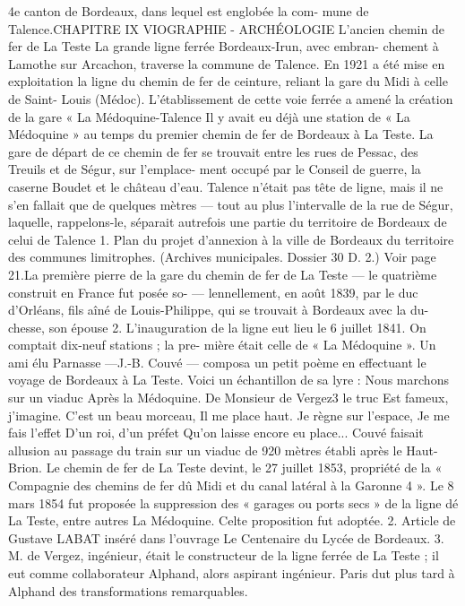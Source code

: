 \documentclass[a4paper,11pt]{book}
\begin{document}
4e canton de Bordeaux, dans lequel est englobée la com-
mune de Talence.CHAPITRE IX
VIOGRAPHIE - ARCHÉOLOGIE
L'ancien chemin de fer de La Teste
La grande ligne ferrée Bordeaux-Irun, avec embran-
chement à Lamothe sur Arcachon, traverse la commune
de Talence.
En 1921 a été mise en exploitation la ligne du chemin
de fer de ceinture, reliant la gare du Midi à celle de Saint-
Louis (Médoc). L'établissement de cette voie ferrée a amené
la création de la gare « La Médoquine-Talence
Il y avait eu déjà une station de « La Médoquine » au
temps du premier chemin de fer de Bordeaux à La Teste.
La gare de départ de ce chemin de fer se trouvait entre
les rues de Pessac, des Treuils et de Ségur, sur l'emplace-
ment occupé par le Conseil de guerre, la caserne Boudet
et le château d'eau.
Talence n'était pas tête de ligne, mais il ne s'en fallait
que de quelques mètres — tout au plus l'intervalle de la
rue de Ségur, laquelle, rappelons-le, séparait autrefois
une partie du territoire de Bordeaux de celui de Talence
1. Plan du projet d'annexion à la ville de Bordeaux du territoire des
communes limitrophes. (Archives municipales. Dossier 30 D. 2.) Voir
page 21.La première pierre de la gare du chemin de fer de La
Teste — le quatrième construit en France
fut
posée so-
—
lennellement, en août 1839, par le duc d'Orléans, fils aîné de
Louis-Philippe, qui se trouvait à Bordeaux avec la du-
chesse, son épouse 2. L'inauguration de la ligne eut lieu
le 6 juillet 1841. On comptait dix-neuf stations ; la pre-
mière était celle de « La Médoquine ».
Un ami élu Parnasse —J.-B. Couvé — composa un petit
poème en effectuant le voyage de Bordeaux à La Teste.
Voici un échantillon de sa lyre :
Nous marchons sur un viaduc
Après la Médoquine.
De Monsieur de Vergez3 le truc
Est fameux, j'imagine.
C'est un beau morceau,
Il me place haut.
Je règne sur l'espace,
Je me fais l'effet
D'un roi, d'un préfet
Qu'on laisse encore eu place...
Couvé faisait allusion au passage du train sur un viaduc
de 920 mètres établi après le Haut-Brion.
Le chemin de fer de La Teste devint, le 27 juillet 1853,
propriété de la « Compagnie des chemins de fer dû Midi
et du canal latéral à la Garonne 4 ». Le 8 mars 1854 fut
proposée la suppression des « garages ou ports secs » de
la ligne dé La Teste, entre autres La Médoquine. Celte
proposition fut adoptée.
2. Article de Gustave LABAT inséré dans l'ouvrage Le Centenaire du
Lycée de Bordeaux.
3. M. de Vergez, ingénieur, était le constructeur de la ligne ferrée de
La Teste ; il eut comme collaborateur Alphand, alors aspirant ingénieur.
Paris dut plus tard à Alphand des transformations remarquables.
\end{document}
